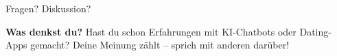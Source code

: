 \documentclass[10pt,aspectratio=169]{beamer}
\begin{document}
	\begin{frame}{Fragen? Diskussion?}
		\begin{center}
			\LARGE \textbf{Was denkst du?}
			\vspace{1cm}
			\large Hast du schon Erfahrungen mit KI-Chatbots oder Dating-Apps gemacht?
			\vspace{1cm}
			\alert{Deine Meinung zählt – sprich mit anderen darüber!}
		\end{center}
	\end{frame}
	
\end{document}

